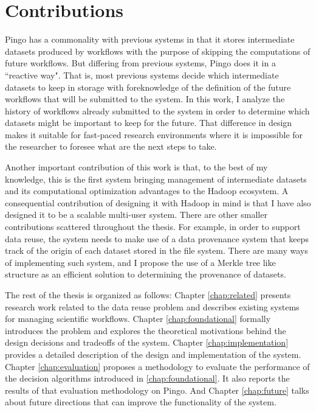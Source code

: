 \section{Contributions}
Pingo has a commonality with previous systems \citep{altintas2004kepler, yuan2012data, deelman2015pegasus} in that it stores intermediate datasets produced by workflows with the purpose of skipping the computations of future workflows. But differing from previous systems, Pingo does it in a ``reactive way".  That is, most previous systems decide which intermediate datasets to keep in storage with foreknowledge of the definition of the future workflows that will be submitted to the system.  In this work, I analyze the history of workflows already submitted to the system in order to determine which datasets might be important to keep for the future. That difference in design makes it suitable for fast-paced research environments where it is impossible for the researcher to foresee what are the next steps to take.

Another important contribution of this work is that, to the best of my knowledge, this is the first system bringing management of intermediate datasets and its computational optimization advantages to the Hadoop ecosystem.  A consequential contribution of designing it with Hadoop in mind is that I have also designed it to be a scalable multi-user system.  There are other smaller contributions scattered throughout the thesis. For example, in order to support data reuse, the system needs to make use of a data provenance system that keeps track of the origin of each dataset stored in the file system. There are many ways of implementing such system, and I propose the use of a Merkle tree like structure as an efficient solution to determining the provenance of datasets.  

The rest of the thesis is organized as follows: Chapter \ref{chap:related} presents research work related to the data reuse problem and describes existing systems for managing scientific workflows.  Chapter \ref{chap:foundational} formally introduces the problem and explores the theoretical motivations behind the design decisions and tradeoffs of the system. Chapter \ref{chap:implementation} provides a detailed description of the design and implementation of the system.  Chapter \ref{chap:evaluation} proposes a methodology to evaluate the performance of the decision algorithms introduced in \ref{chap:foundational}.  It also reports the results of that evaluation methodology on Pingo.  And Chapter \ref{chap:future} talks about future directions that can improve the functionality of the system.